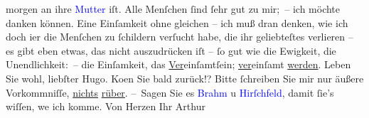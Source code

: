                     morgen an ihre \textcolor{blue}{Mutter}{} iſt.
                    Alle Menſchen ſind ſehr gut zu mir; – ich möchte danken können. Eine Einſamkeit
                    ohne gleichen – ich muß dran denken, wie ich doch i{\geminationm}er die Menſchen zu ſchildern verſucht habe, die ihr geliebteſtes verlieren –
                        {\pb}es gibt eben etwas, das nicht auszudrücken iſt –
                    ſo gut wie die Ewigkeit, die Unendlichkeit: – die Einſamkeit, das \uline{Ver}einſamtſein; \uline{ver}einſamt \uline{werden}.\pend
           \pstart
           Leben Sie wohl, liebſter Hugo. Ko{\geminationm}en Sie bald
                    zurück!? Bitte ſchreiben Sie mir nur äußere Vorkommniſſe, \uline{nichts}{ }\uline{rüber}.\pend
           \pstart
           – Sagen Sie es \textcolor{blue}{Brahm}{}\ledrightnote{\textcolor{blue}{Otto Brahm}} u \textcolor{blue}{Hirſchfeld}{}\ledrightnote{\textcolor{blue}{Georg Hirschfeld}}, damit ſie’s wiſſen, we{\geminationn} ich komme.\pend
           \pstart Von Herzen Ihr \spacefill\mbox{Arthur}\pend{}\endnumbering{}  
      